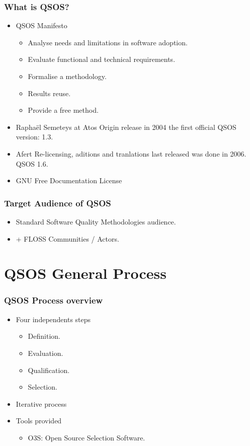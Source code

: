 \documentclass{beamer}
\begin{document}
\begin{frame}
\frametitle{What is QSOS?}
\begin{itemize}
\item QSOS Manifesto
\begin{itemize}
 \item Analyse needs and limitations in software adoption.
 \item Evaluate functional and technical requirements.
 \item Formalise a methodology.
 \item Results reuse.
 \item Provide a free method.
\end{itemize}

\item Raphaël Semeteys at Atos Origin release in 2004 the first official QSOS version: 1.3.
\item Afert Re-licensing, aditions and tranlations last released was done in 2006. QSOS 1.6. 
\item GNU Free Documentation License
\end{itemize}
\end{frame}


\begin{frame}
 \frametitle{Target Audience of QSOS}
 \begin{itemize}
 \item Standard Software Quality Methodologies audience.
 \item + FLOSS Communities / Actors.
 \end{itemize}
\end{frame}



\section{QSOS General Process}


\begin{frame}
\frametitle{QSOS Process overview}
 \begin{itemize}
 \item Four independents steps
   \begin{itemize}
   \item Definition.
   \item Evaluation.
   \item Qualification.
   \item Selection.
   \end{itemize}
 \item Iterative process
 \item Tools provided
   \begin{itemize}
   \item O3S: Open Source Selection Software.
   \end{itemize}

 \end{itemize}
\end{frame}
\end{document}
